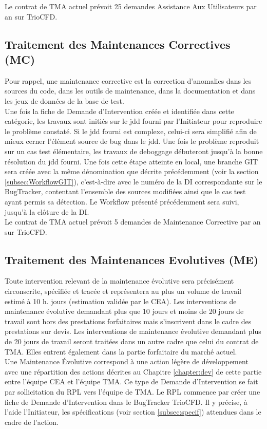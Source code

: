 Le contrat de TMA actuel prévoit 25 demandes Assistance Aux Utilisateurs par an sur TrioCFD.

\subsection{Traitement des Maintenances Correctives (MC)}
Pour rappel, une maintenance corrective est la correction d'anomalies dans les sources du code, dans les outils de maintenance, dans la documentation et dans les jeux de données de la base de test.\\
Une fois la fiche de Demande d'Intervention créée et identifiée dans cette catégorie, les travaux sont initiés sur le jdd fourni par l'Initiateur pour reproduire le problème constaté. Si le jdd fourni est complexe, celui-ci sera simplifié afin de mieux cerner l'élément source de bug dans le jdd. Une fois le problème reproduit sur un cas test élémentaire, les travaux de deboggage débuteront jusqu'à la bonne résolution du jdd fourni. Une fois cette étape atteinte en local, une branche GIT sera créée avec la même dénomination que décrite précédemment (voir la section \ref{subsec:WorkflowGIT}), c'est-à-dire avec le numéro de la DI correspondante sur le BugTracker, contentant l'ensemble des sources modifiées ainsi que le cas test ayant permis sa détection. Le Workflow présenté précédemment sera suivi, jusqu'à la clôture de la DI.\\

Le contrat de TMA actuel prévoit 5 demandes de Maintenance Corrective par an sur TrioCFD.

\subsection{Traitement des Maintenances Evolutives (ME)}
Toute intervention relevant de la maintenance évolutive sera précisément circonscrite, spécifiée et tracée et représentera au plus un volume de travail estimé à 10 h. jours (estimation validée par le CEA). Les interventions de maintenance évolutive demandant plus que 10 jours et moins de 20 jours de travail sont hors des prestations forfaitaires mais s'inscrivent dans le cadre des prestations sur devis. Les interventions de maintenance évolutive demandant plus de 20 jours de travail seront traitées dans un autre cadre que celui du contrat de TMA. Elles entrent également dans la partie forfaitaire du marché actuel.\\

Une Maintenance Évolutive correspond à une action légère de développement avec une répartition des actions décrites au Chapitre \ref{chapter:dev} de cette partie entre l'équipe CEA et l'équipe TMA. Ce type de Demande d'Intervention se fait par sollicitation du RPL vers l'équipe de TMA. Le RPL commence par créer une fiche de Demande d'Intervention dans le BugTracker TrioCFD. Il y précise, à l'aide l'Initiateur, les spécifications (voir section \ref{subsec:specif}) attendues dans le cadre de l'action.\\

